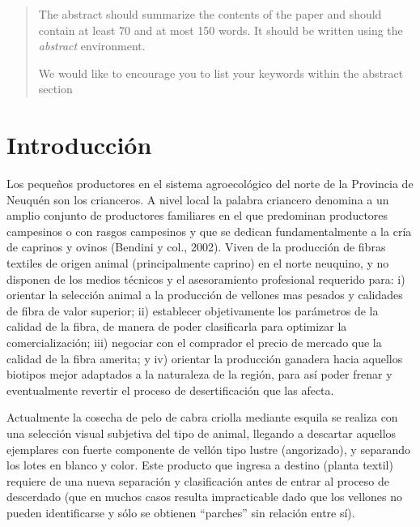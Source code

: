\documentclass[runningheads,a4paper]{llncs}
\newcommand{\keywords}[1]{\par\addvspace\baselineskip
\noindent\keywordname\enspace\ignorespaces#1}
\begin{document}
\begin{abstract}
The abstract should summarize the contents of the paper and should
contain at least 70 and at most 150 words. It should be written using the
\emph{abstract} environment.
\keywords{We would like to encourage you to list your keywords within
the abstract section}
\end{abstract}


\section{Introducción}

Los pequeños productores en el sistema agroecológico del norte de la Provincia de Neuquén son los crianceros. A nivel local la palabra criancero denomina a un amplio conjunto de productores familiares en el que predominan productores campesinos o con rasgos campesinos y que se dedican fundamentalmente a la cría de caprinos y ovinos (Bendini y col., 2002). Viven de la producción de fibras textiles de origen animal (principalmente caprino) en el norte neuquino, y no disponen de los medios técnicos y el asesoramiento profesional requerido para: i) orientar la selección animal a la producción de vellones mas pesados y calidades de fibra de valor superior; ii) establecer objetivamente los parámetros de la calidad de la fibra, de manera de poder clasificarla para optimizar la comercialización; iii) negociar con el comprador el precio de mercado que la calidad de la fibra amerita; y iv) orientar la producción ganadera hacia aquellos biotipos mejor adaptados a la naturaleza de la región, para así poder frenar y eventualmente revertir el proceso de desertificación que las afecta.

Actualmente la cosecha de pelo de cabra criolla mediante esquila se realiza con una selección visual subjetiva del tipo de animal, llegando a descartar aquellos ejemplares con fuerte componente de vellón tipo lustre (angorizado), y separando los lotes en blanco y color. Este producto que ingresa a destino (planta textil) requiere de una nueva separación y clasificación antes de entrar al proceso de descerdado (que en muchos casos resulta impracticable dado que los vellones no pueden identificarse y sólo se obtienen “parches” sin relación entre sí).
\end{document}
